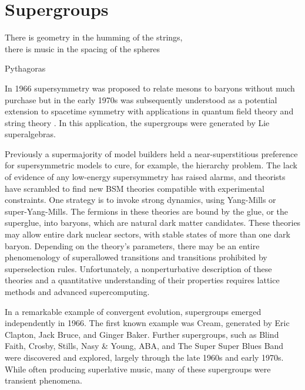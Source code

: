 \section{Supergroups}

\epigraph{There is geometry in the humming of the strings,\\
there is music in the spacing of the spheres}{Pythagoras}


In 1966 supersymmetry was proposed to relate mesons to baryons\cite{doi:10.1143/PTP.36.1266} without much purchase but in the early 1970s was subsequently understood as a potential extension to spacetime symmetry with applications in quantum field theory and string theory \cite{Gervais:1971ji,Ramond:1971gb,Volkov:1973ix,Wess:1974tw}.
In this application, the supergroups were generated by Lie superalgebras.

Previously a supermajority of model builders held a near-superstitious preference for supersymmetric models to cure, for example, the hierarchy problem.
The lack of evidence of any low-energy supersymmetry has raised alarms, and theorists have scrambled to find new BSM theories compatible with experimental constraints.
One strategy is to invoke strong dynamics, using Yang-Mills or super-Yang-Mills.
The fermions in these theories are bound by the glue, or the superglue, into baryons, which are natural dark matter candidates.
These theories may allow entire dark nuclear sectors, with stable states of more than one dark baryon.
Depending on the theory's parameters, there may be an entire phenomenology of superallowed transitions and transitions prohibited by superselection rules.
Unfortunately, a nonperturbative description of these theories and a quantitative understanding of their properties requires lattice methods and advanced supercomputing.

In a remarkable example of convergent evolution, supergroups emerged independently in 1966.
The first known example was Cream, generated by Eric Clapton, Jack Bruce, and Ginger Baker\cite{supergroups}.
Further supergroups, such as Blind Faith, Crosby, Stills, Nasy \& Young, ABA, and The Super Super Blues Band\cite{supersuperblues} were discovered and explored, largely through the late 1960s and early 1970s.
While often producing superlative music, many of these supergroups were transient phenomena.